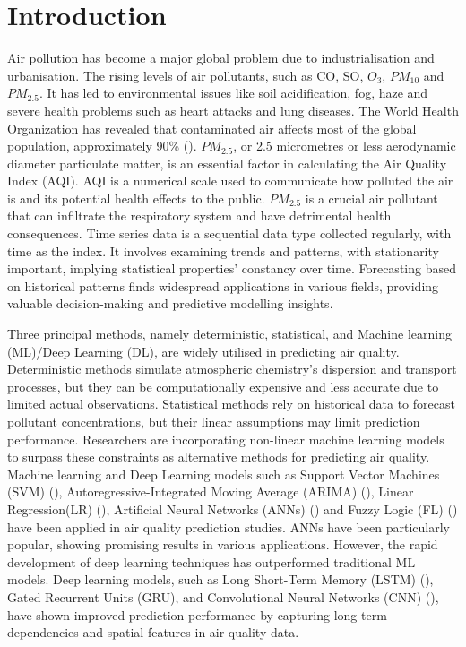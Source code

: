 \documentclass[a4paper, fleqn]{cas-sc}
\theoremstyle{definition}
\theoremstyle{remark}
\begin{document}
\maketitle

\section{Introduction}
Air pollution has become a major global problem due to industrialisation and urbanisation. The rising levels of air pollutants,  such as CO,  SO,  $O_3$,  $PM_{10}$ and $PM_{2.5}$. It has led to environmental issues like soil acidification,  fog, haze and severe health problems such as heart attacks and lung diseases. The World Health Organization has revealed that contaminated air affects most of the global population,  approximately 90\% (\cite{zhou2019effects}). $PM_{2.5}$,  or 2.5 micrometres or less aerodynamic diameter particulate matter, is an essential factor in calculating the Air Quality Index (AQI). AQI is a numerical scale used to communicate how polluted the air is and its potential health effects to the public. $PM_{2.5}$ is a crucial air pollutant that can infiltrate the respiratory system and have detrimental health consequences. Time series data is a sequential data type collected regularly, with time as the index. It involves examining trends and patterns,  with stationarity important, implying statistical properties' constancy over time. Forecasting based on historical patterns finds widespread applications in various fields,  providing valuable decision-making and predictive modelling insights.
\par Three principal methods,  namely deterministic,  statistical,  and Machine learning (ML)/Deep Learning (DL),  are widely utilised in predicting air quality. Deterministic methods simulate atmospheric chemistry's dispersion and transport processes,  but they can be computationally expensive and less accurate due to limited actual observations. Statistical methods rely on historical data to forecast pollutant concentrations,  but their linear assumptions may limit prediction performance. Researchers are incorporating non-linear machine learning models to surpass these constraints as alternative methods for predicting air quality. Machine learning and Deep Learning models such as Support Vector Machines (SVM) (\cite{lin2011forecasting}), Autoregressive-Integrated Moving Average (ARIMA) (\cite{kumari2022machine}),  Linear Regression(LR) (\cite{kumari2022deep}),  Artificial Neural Networks (ANNs) (\cite{taylan2017modelling}) and Fuzzy Logic (FL) (\cite{wang2015model}) have been applied in air quality prediction studies. ANNs have been particularly popular,  showing promising results in various applications. However,  the rapid development of deep learning techniques has outperformed traditional ML models. Deep learning models,  such as Long Short-Term Memory (LSTM) (\cite{kristiani2022short}),  Gated Recurrent Units (GRU),  and Convolutional Neural Networks (CNN) (\cite{ayturan2018air}),  have shown improved prediction performance by capturing long-term dependencies and spatial features in air quality data.
\end{document}
